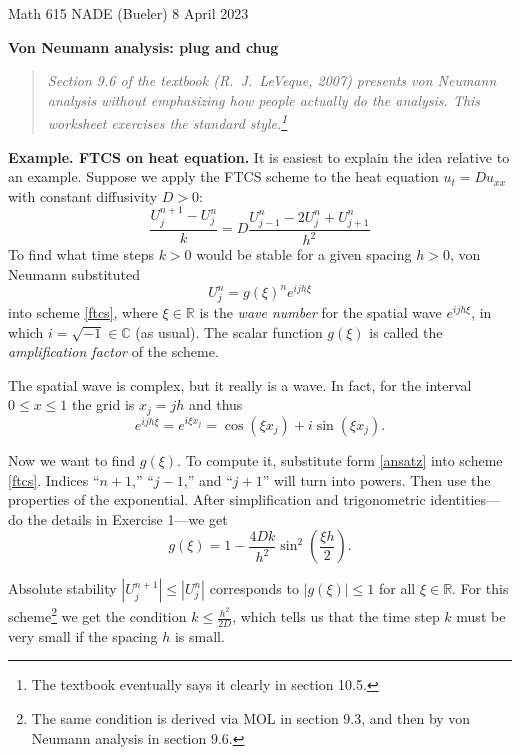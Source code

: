 \documentclass[11pt]{amsart}
\newcommand{\CC}{\mathbb{C}}
\newcommand{\RR}{\mathbb{R}}
\newcommand{\prob}[1]{\bigskip\noindent\textbf{#1.}\quad }
\begin{document}
\scriptsize \noindent Math 615 NADE (Bueler) \hfill 8 April 2023 \quad {}
\normalsize\medskip

\Large\centerline{\textbf{Von Neumann analysis: plug and chug}}
\medskip
\normalsize

\thispagestyle{empty}
\begin{quote}
\emph{Section 9.6 of the textbook (R.~J.~LeVeque, 2007) presents von Neumann analysis without emphasizing how people actually \emph{do} the analysis.  This worksheet exercises the standard style.\footnote{The textbook eventually says it clearly in section 10.5.}}
\end{quote}


\prob{Example. FTCS on heat equation}  It is easiest to explain the idea relative to an example.  Suppose we apply the FTCS scheme to the heat equation $u_t = D u_{xx}$ with constant diffusivity $D>0$:
\begin{equation}
\frac{U_j^{n+1} - U_j^n}{k} = D \frac{U_{j-1}^n - 2 U_j^n + U_{j+1}^n}{h^2}  \label{ftcs}
\end{equation}
To find what time steps $k>0$ would be stable for a given spacing $h>0$, von Neumann substituted
\begin{equation}
U_j^n = g(\xi)^n e^{ijh\xi}  \label{ansatz}
\end{equation}
into scheme \eqref{ftcs}, where $\xi \in \RR$ is the \emph{wave number} for the spatial wave $e^{ijh\xi}$, in which $i=\sqrt{-1} \in \CC$ (as usual).  The scalar function $g(\xi)$ is  called the \emph{amplification factor} of the scheme.

The spatial wave is complex, but it really is a wave.  In fact, for the interval $0\le x \le 1$ the grid is $x_j = jh$ and thus
    $$e^{ijh\xi} = e^{i \xi x_j} = \cos(\xi x_j) + i \sin(\xi x_j).$$

Now we want to find $g(\xi)$.  To compute it, substitute form \eqref{ansatz} into scheme \eqref{ftcs}.  Indices ``$n+1$,'' ``$j-1$,'' and ``$j+1$'' will turn into powers.  Then use the properties of the exponential.  After simplification and trigonometric identities---do the details in Exercise 1---we get
    $$g(\xi) = 1 - \frac{4Dk}{h^2} \sin^2\left(\frac{\xi h}{2}\right).$$

Absolute stability $|U_j^{n+1}| \le |U_j^{n}|$ corresponds to $|g(\xi)|\le 1$ for all $\xi \in \RR$.  For this scheme\footnote{The same condition is derived via MOL in section 9.3, and then by von Neumann analysis in section 9.6.} we get the condition $\displaystyle k \le \frac{h^2}{2D}$, which tells us that the time step $k$ must be very small if the spacing $h$ is small.
\end{document}
